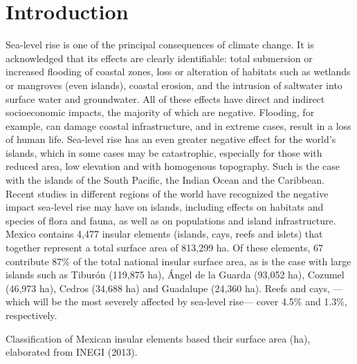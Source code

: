 \documentclass{article} %
\begin{document}
\section{Introduction}

Sea-level rise is one of the principal consequences of climate change. It is
acknowledged that its effects are clearly identifiable: total submersion or increased
flooding of coastal zones, loss or alteration of habitats such as wetlands or mangroves
(even islands), coastal erosion, and the intrusion of saltwater into surface water and
groundwater. All of these effects have direct and indirect socioeconomic impacts, the
majority of which are negative. Flooding, for example, can damage coastal
infrastructure, and in extreme cases, result in a loss of human life. Sea-level rise has
an even greater negative effect for the world’s islands, which in some cases may be
catastrophic, especially for those with reduced area, low elevation and with
homogenous topography. Such is the case with the islands of the South Pacific, the
Indian Ocean and the Caribbean. Recent studies in different regions of the world have
recognized the negative impact sea-level rise may have on islands, including effects
on habitats and species of flora and fauna, as well as on populations and island
infrastructure. Mexico contains 4,477 insular elements (islands, cays, reefs and islets)
that together represent a total surface area of 813,299 ha. Of these elements, 67
contribute 87\% of the total national insular surface area, as is the case with large
islands such as Tiburón (119,875 ha), Ángel de la Guarda (93,052 ha), Cozumel
(46,973 ha), Cedros (34,688 ha) and Guadalupe (24,360 ha). Reefs and cays, —
which will be the most severely affected by sea-level rise— cover 4.5\% and 1.3\%,
respectively.\\

\begin{table}
\centering
\caption{Classification of Mexican insular elements based their surface area (ha), elaborated from INEGI (2013).}
\label{Tab:tab1}
\end{table}
\end{document}
